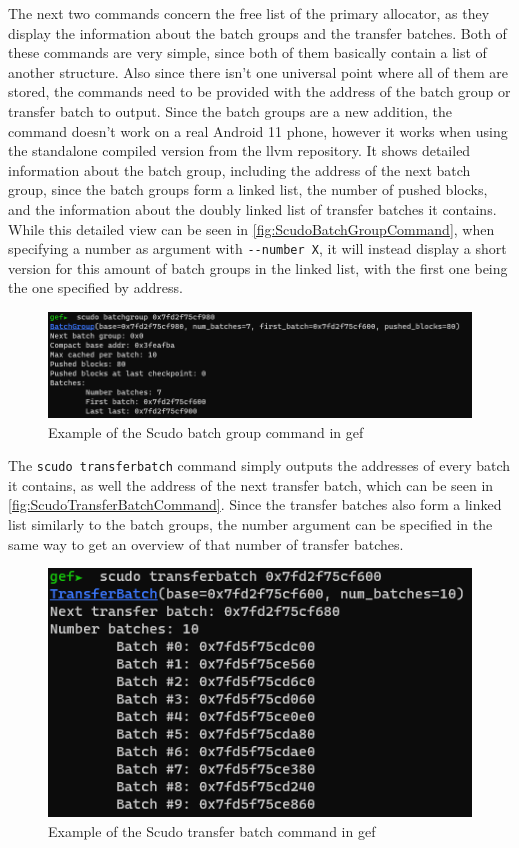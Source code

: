 \documentclass[a4paper,11pt,oneside]{report}
\begin{document}
The next two commands concern the free list of the primary allocator, as they
display the information about the batch groups and the transfer batches. Both
of these commands are very simple, since both of them basically contain a list
of another structure. Also since there isn't one universal point where all of
them are stored, the commands need to be provided with the address of the
batch group or transfer batch to output.
Since the batch groups are a new addition, the command doesn't work on a real
Android 11 phone, however it works when using the standalone compiled version
from the llvm repository. It shows detailed information about the batch group,
including the address of the next batch group, since the batch groups form a
linked list, the number of pushed blocks, and the information about the doubly
linked list of transfer batches it contains. While this detailed view can be
seen in \autoref{fig:ScudoBatchGroupCommand}, when specifying a number as
argument with \verb|--number X|, it will instead display a short version for this
amount of batch groups in the linked list, with the first one being the one
specified by address.

\begin{figure}[h!]
  \centering
  \includegraphics[width=\linewidth]{figures/ScudoBatchGroupCommand.png}
  \caption{Example of the Scudo batch group command in gef}
  \label{fig:ScudoBatchGroupCommand}
\end{figure}

The \verb|scudo transferbatch| command simply outputs the addresses of every batch
it contains, as well the address of the next transfer batch, which can be seen
in \autoref{fig:ScudoTransferBatchCommand}. Since the transfer batches also
form a linked list similarly to the batch groups, the number argument can be
specified in the same way to get an overview of that number of transfer batches.

\begin{figure}[h!]
  \centering
  \includegraphics{figures/ScudoTransferBatchCommand.png}
  \caption{Example of the Scudo transfer batch command in gef}
  \label{fig:ScudoTransferBatchCommand}
\end{figure}
\end{document}
